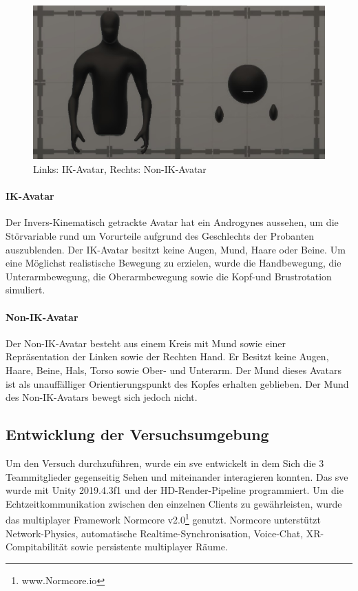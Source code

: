 \documentclass[a4paper,11pt]{article}%
\renewcommand{\\}{\vspace*{0.5\baselineskip} \newline}
\begin{document}
	\begin{figure}[H]
		\begin{footnotesize}
			\includegraphics[width=\textwidth]{Abbildungen/Avatars.JPG}\\
			\caption[Abbildung 1]{Links: IK-Avatar, Rechts: Non-IK-Avatar}
			\label{Framework}
		\end{footnotesize}
	\end{figure}

		\paragraph{IK-Avatar}
Der Invers-Kinematisch getrackte Avatar hat ein Androgynes aussehen, um die Störvariable rund um Vorurteile aufgrund des Geschlechts der Probanten auszublenden. Der IK-Avatar besitzt keine Augen, Mund, Haare oder Beine. 
Um eine Möglichst realistische Bewegung zu erzielen, wurde die Handbewegung, die Unterarmbewegung, die Oberarmbewegung sowie die Kopf-und Brustrotation simuliert.

		\paragraph{Non-IK-Avatar}
Der Non-IK-Avatar besteht aus einem Kreis mit Mund sowie einer Repräsentation der Linken sowie der Rechten Hand. Er Besitzt keine Augen, Haare, Beine, Hals, Torso sowie Ober- und Unterarm. Der Mund dieses Avatars ist als unauffälliger Orientierungspunkt des Kopfes erhalten geblieben. Der Mund des Non-IK-Avatars bewegt sich jedoch nicht. 
	\newpage

	\subsection{Entwicklung der Versuchsumgebung}
Um den Versuch durchzuführen, wurde ein \ac{sve} entwickelt in dem Sich die 3 Teammitglieder gegenseitig Sehen und miteinander interagieren konnten. 
Das \ac{sve} wurde mit Unity 2019.4.3f1 und der HD-Render-Pipeline programmiert. Um die Echtzeitkommunikation zwischen den einzelnen Clients zu gewährleisten, wurde das multiplayer Framework \flqq Normcore v2.0\frqq \footnote{www.Normcore.io} genutzt.
Normcore unterstützt Network-Physics, automatische Realtime-Synchronisation, Voice-Chat, XR-Compitabilität sowie persistente multiplayer Räume.	
\end{document}
